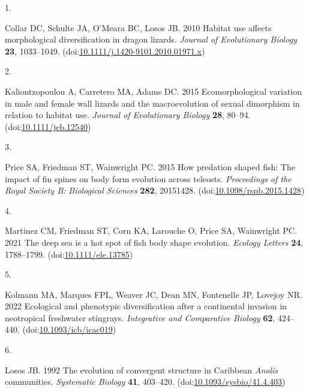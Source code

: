 \documentclass[
  11pt,
]{article}
\newlength{\cslhangindent}
\newlength{\csllabelwidth}
\newlength{\cslentryspacingunit} %
\newenvironment{CSLReferences}[2] %
 {%
  \setlength{\parindent}{0pt}
  \ifodd #1
  \let\oldpar\par
  \def\par{\hangindent=\cslhangindent\oldpar}
  \fi
  \setlength{\parskip}{#2\cslentryspacingunit}
 }%
 {}
\newcommand{\CSLLeftMargin}[1]{\parbox[t]{\csllabelwidth}{#1}}
\newcommand{\CSLRightInline}[1]{\parbox[t]{\linewidth - \csllabelwidth}{#1}\break}
\begin{document}
\setlength{\parindent}{-0.25in} \setlength{\leftskip}{0.25in}
\setlength{\parskip}{8pt} \noindent

\hypertarget{refs}{}
\begin{CSLReferences}{0}{0}
\leavevmode{}%
\CSLLeftMargin{1. }%
\CSLRightInline{Collar DC, Schulte JA, O'Meara BC, Losos JB. 2010
Habitat use affects morphological diversification in dragon lizards.
\emph{Journal of Evolutionary Biology} \textbf{23}, 1033--1049.
(doi:\href{https://doi.org/10.1111/j.1420-9101.2010.01971.x}{10.1111/j.1420-9101.2010.01971.x})}

\leavevmode{}%
\CSLLeftMargin{2. }%
\CSLRightInline{Kaliontzopoulou A, Carretero MA, Adams DC. 2015
Ecomorphological variation in male and female wall lizards and the
macroevolution of sexual dimorphism in relation to habitat use.
\emph{Journal of Evolutionary Biology} \textbf{28}, 80--94.
(doi:\href{https://doi.org/10.1111/jeb.12540}{10.1111/jeb.12540})}

\leavevmode{}%
\CSLLeftMargin{3. }%
\CSLRightInline{Price SA, Friedman ST, Wainwright PC. 2015 How predation
shaped fish: The impact of fin spines on body form evolution across
teleosts. \emph{Proceedings of the Royal Society B: Biological Sciences}
\textbf{282}, 20151428.
(doi:\href{https://doi.org/10.1098/rspb.2015.1428}{10.1098/rspb.2015.1428})}

\leavevmode{}%
\CSLLeftMargin{4. }%
\CSLRightInline{Martinez CM, Friedman ST, Corn KA, Larouche O, Price SA,
Wainwright PC. 2021 The deep sea is a hot spot of fish body shape
evolution. \emph{Ecology Letters} \textbf{24}, 1788--1799.
(doi:\href{https://doi.org/10.1111/ele.13785}{10.1111/ele.13785})}

\leavevmode{}%
\CSLLeftMargin{5. }%
\CSLRightInline{Kolmann MA, Marques FPL, Weaver JC, Dean MN, Fontenelle
JP, Lovejoy NR. 2022 Ecological and phenotypic diversification after a
continental invasion in neotropical freshwater stingrays.
\emph{Integrative and Comparative Biology} \textbf{62}, 424--440.
(doi:\href{https://doi.org/10.1093/icb/icac019}{10.1093/icb/icac019})}

\leavevmode{}%
\CSLLeftMargin{6. }%
\CSLRightInline{Losos JB. 1992 The evolution of convergent structure in
{C}aribbean \emph{{A}nolis} communities. \emph{Systematic Biology}
\textbf{41}, 403--420.
(doi:\href{https://doi.org/10.1093/sysbio/41.4.403}{10.1093/sysbio/41.4.403})}


\end{CSLReferences}
\end{document}
